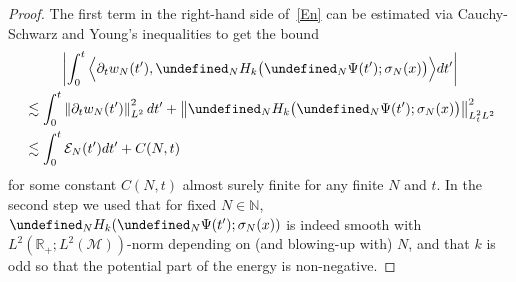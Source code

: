 \documentclass[AHL,Unicode,longabstracts,published]{cedram}
\newcommand{\R}{\mathbb{R}}
\newcommand{\N}{\mathbb{N}}
\let\P= \undefined
\newcommand{\P}{\mathbf{P}}
\newcommand{\En}{\mathcal{E}}
\newcommand{\M}{\mathcal{M}}
\newcommand{\s}{\sigma}
\newcommand{\dt}{\partial_t}
\newcommand{\les}{\lesssim}
\begin{document}
\begin{proof}
The first term in the right-hand side of~\eqref{En} can be estimated via Cauchy-Schwarz and Young's inequalities to get the bound
\begin{multline*}
\left|\int_0^t\Big\langle \dt w_N(t'), \P_NH_k\big(\P_N\Psi(t');\s_N(x)\big)\Big\rangle dt'\right|\\
\begin{aligned}
&\les \int_0^t\left\|\dt w_N(t')\right\|_{L^2}^2dt' + \big\|\P_NH_k\big(\P_N\Psi(t');\s_N(x)\big)\big\|_{L^2_tL^2}^2\\
&\les \int_0^t\En_N(t')dt' + C(N,t)
\end{aligned}
\end{multline*}
for some constant $C(N,t)$ almost surely finite for any finite $N$ and $t$. In the second step we used that for fixed $N\in\N$, $\P_NH_k(\P_N\Psi(t');\s_N(x))$ is indeed smooth with $L^2(\R_+;L^2(\M))$-norm depending on (and blowing-up with) $N$, and that $k$ is odd so that the potential part of the energy is non-negative.


\end{proof}
\end{document}
